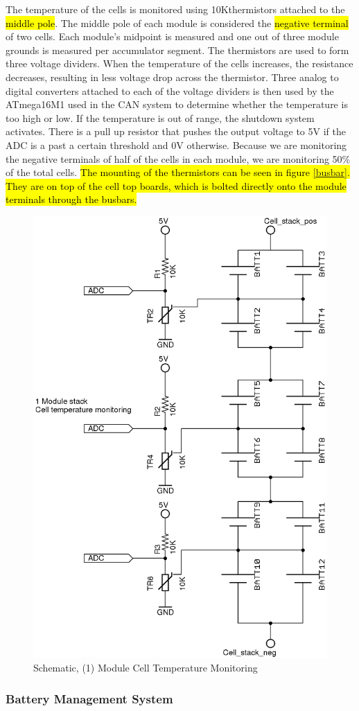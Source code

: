 \documentclass{article}
\DeclareRobustCommand{\hlr}[1]{{\sethlcolor{red}\hl{#1}}}
\begin{document}
            The temperature of the cells is monitored using 10K\ohm thermistors attached to the \hlr{middle pole}. The middle pole of each module is considered the \hlr{negative terminal} of two cells. Each module’s midpoint is measured and one out of three module grounds is measured per accumulator segment. The thermistors are used to form three voltage dividers. When the temperature of the cells increases, the resistance decreases, resulting in less voltage drop across the thermistor. Three analog to digital converters attached to each of the voltage dividers is then used by the ATmega16M1 used in the CAN system to determine whether the temperature is too high or low. If the temperature is out of range, the shutdown system activates. There is a pull up resistor that pushes the output voltage to 5V if the ADC is a past a certain threshold and 0V otherwise. Because we are monitoring the negative terminals of half of the cells in each module, we are monitoring 50\% of the total cells.
            \hlr{The mounting of the thermistors can be seen in figure \ref{busbar}. They are on top of the cell top boards, which is bolted directly onto the module terminals through the busbars.}


            \begin{figure}[H]
            \centering
            \includegraphics[width = 0.4 \textwidth]{celltemp}
            \caption{Schematic, (1) Module Cell Temperature Monitoring}
            \label{celltemp}
            \end{figure}

        \subsubsection{Battery Management System} \label{bms}
\end{document}
